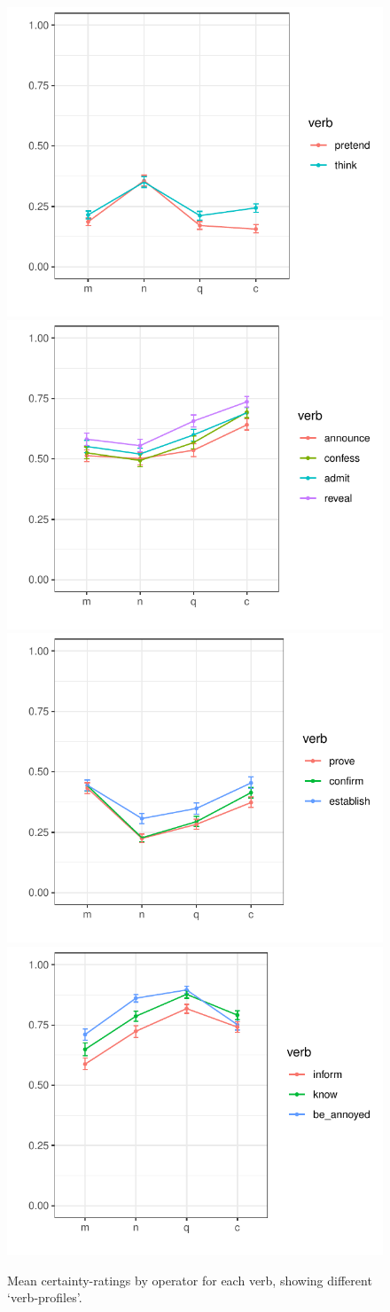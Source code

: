 \documentclass[12pt, a4paper]{article}
\begin{document}
\begin{figure}[h]
	\hspace{-2em}
	\begin{minipage}{1.1\textwidth}\centering
		\includegraphics[width=.24\linewidth]{graphs/profile1.pdf}
		\includegraphics[width=.24\linewidth]{graphs/profile2.pdf}
		\includegraphics[width=.24\linewidth]{graphs/profile4.pdf}
		\includegraphics[width=.24\linewidth]{graphs/profile5.pdf}
	\end{minipage}
	\vspace{-\baselineskip}
	\caption{Mean certainty-ratings by operator for each verb, showing different \lq verb-profiles\rq.}
	\label{fig:figure2}
\end{figure}

\newpage

\end{document}
